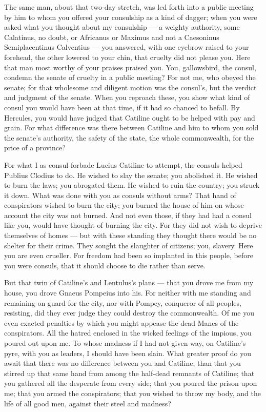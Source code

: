  The same man, about that two-day stretch, was led forth into a public meeting by him to whom you offered your consulship as a kind of dagger; when you were asked what you thought about my consulship — a weighty authority, some Calatinus, no doubt, or Africanus or Maximus and not a Caesoninus Semiplacentinus Calventius — you answered, with one eyebrow raised to your forehead, the other lowered to your chin, that cruelty did not please you. Here that man most worthy of your praises praised you. You, gallowsbird, the consul, condemn the senate of cruelty in a public meeting? For not me, who obeyed the senate; for that wholesome and diligent motion was the consul's, but the verdict and judgment of the senate. When you reproach these, you show what kind of consul you would have been at that time, if it had so chanced to befall. By Hercules, you would have judged that Catiline ought to be helped with pay and grain. For what difference was there between Catiline and him to whom you sold the senate's authority, the safety of the state, the whole commonwealth, for the price of a province?

 For what I as consul forbade Lucius Catiline to attempt, the consuls helped Publius Clodius to do. He wished to slay the senate; you abolished it. He wished to burn the laws; you abrogated them. He wished to ruin the country; you struck it down. What was done with you as consuls without arms? That hand of conspirators wished to burn the city; you burned the house of him on whose account the city was not burned. And not even those, if they had had a consul like you, would have thought of burning the city. For they did not wish to deprive themselves of homes — but with these standing they thought there would be no shelter for their crime. They sought the slaughter of citizens; you, slavery. Here you are even crueller. For freedom had been so implanted in this people, before you were consuls, that it should choose to die rather than serve.

 But that twin of Catiline's and Lentulus's plans — that you drove me from my house, you drove Gnaeus Pompeius into his. For neither with me standing and remaining on guard for the city, nor with Pompey, conqueror of all peoples, resisting, did they ever judge they could destroy the commonwealth. Of me you even exacted penalties by which you might appease the dead Manes of the conspirators. All the hatred enclosed in the wicked feelings of the impious, you poured out upon me. To whose madness if I had not given way, on Catiline's pyre, with you as leaders, I should have been slain. What greater proof do you await that there was no difference between you and Catiline, than that you stirred up that same hand from among the half-dead remnants of Catiline; that you gathered all the desperate from every side; that you poured the prison upon me; that you armed the conspirators; that you wished to throw my body, and the life of all good men, against their steel and madness?

